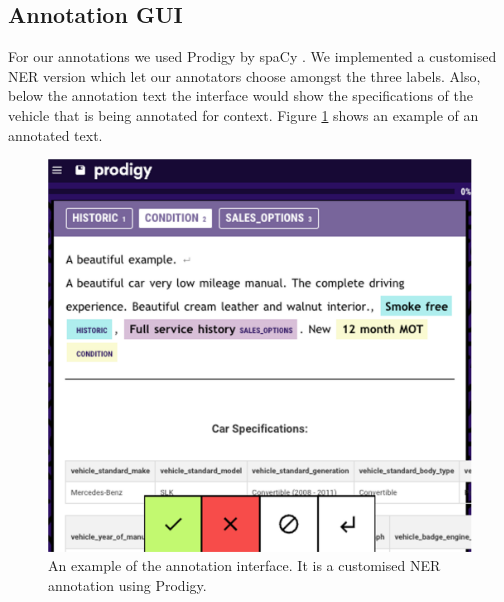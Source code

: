 \documentclass[11pt]{article}
\begin{document}





\subsection{Annotation GUI}

For our annotations we used Prodigy by spaCy \citep{prodigy}. We implemented a customised NER version which let our annotators choose amongst the three labels. Also, below the annotation text the interface would show the specifications of the vehicle that is being annotated for context. Figure \ref{fig:prodigy} shows an example of an annotated text.
\begin{figure}[ht]
    \centering
    \includegraphics[width=\columnwidth]{figures/prodigy.png}
    \caption{An example of the annotation interface. It is a customised NER annotation using Prodigy.}
    \label{fig:prodigy}
\end{figure}
\end{document}
